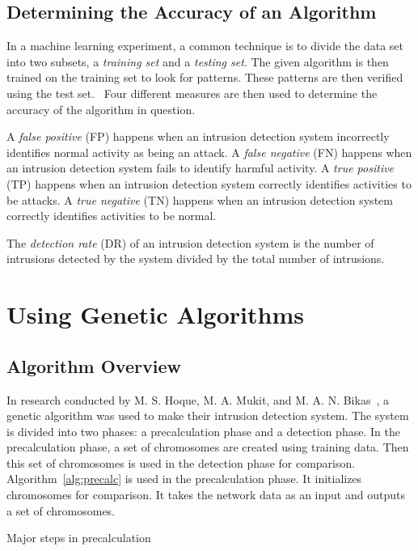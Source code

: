 \documentclass{sig-alternate}
\begin{document}
\subsection{Determining the Accuracy of an Algorithm}
\label{sec:PosNeg}
In a machine learning experiment, a common technique is to divide the data set into two subsets, a \emph{training set} and a \emph{testing set}. The given algorithm is then trained on the training set to look for patterns. These patterns are then verified using the test set.~\cite{bc1_ecindm} Four different measures are then used to determine the accuracy of the algorithm in question.

A \emph{false positive} (FP) happens when an intrusion detection system incorrectly identifies normal activity as being an attack. A \emph{false negative} (FN) happens when an intrusion detection system fails to identify harmful activity. A \emph{true positive} (TP) happens when an intrusion detection system correctly identifies activities to be attacks. A \emph{true negative} (TN) happens when an intrusion detection system correctly identifies activities to be normal.

The \emph{detection rate} (DR) of an intrusion detection system is the number of intrusions detected by the system divided by the total number of intrusions.~\cite{ids}




\section{Using Genetic Algorithms}
\label{sec:genAlgImp}

\subsection{Algorithm Overview}
In research conducted by M. S. Hoque, M. A. Mukit, and M. A. N. Bikas~\cite{DBLP:journals/corr/abs-1204-1336}, a genetic algorithm was used to make their intrusion detection system. The system is divided into two phases: a precalculation phase and a detection phase. In the precalculation phase, a set of chromosomes are created using training data. Then this set of chromosomes is used in the detection phase for comparison. Algorithm~\ref{alg:precalc} is used in the precalculation phase. It initializes chromosomes for comparison. It takes the network data as an input and outputs a set of chromosomes.

\begin{algorithm}
\caption{Major steps in precalculation}
\label{alg:precalc}
\begin{algorithmic}
  \ELSE {}
  \ENDIF
\ENDFOR
\end{algorithmic}
\end{algorithm}
\end{document}
